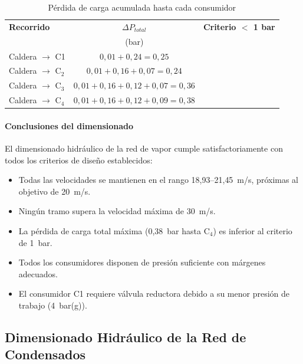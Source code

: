 \documentclass[12pt]{article}
\begin{document}
\begin{table}[H]
	\centering
	\caption{Pérdida de carga acumulada hasta cada consumidor}
	\label{tab:perdidas-acumuladas}
	\begin{tabular}{lcc}
		\toprule
		\textbf{Recorrido}          & \textbf{$\Delta P_{total}$}                  & \textbf{Criterio $<$ 1 bar} \\
		                            & (bar)                                        &                             \\
		\midrule
		Caldera $\rightarrow$ C1 & $0{,}01 + 0{,}24 = 0{,}25$                   & \checkmark                  \\
		Caldera $\rightarrow$ C$_2$ & $0{,}01 + 0{,}16 + 0{,}07 = 0{,}24$          & \checkmark                  \\
		Caldera $\rightarrow$ C$_3$ & $0{,}01 + 0{,}16 + 0{,}12 + 0{,}07 = 0{,}36$ & \checkmark                  \\
		Caldera $\rightarrow$ C$_4$ & $0{,}01 + 0{,}16 + 0{,}12 + 0{,}09 = 0{,}38$ & \checkmark                  \\
		\bottomrule
	\end{tabular}
\end{table}

\paragraph{Conclusiones del dimensionado}

El dimensionado hidráulico de la red de vapor cumple satisfactoriamente con todos los criterios de diseño establecidos:

\begin{itemize}[noitemsep]
	\item Todas las velocidades se mantienen en el rango 18{,}93--21{,}45~m/s, próximas al objetivo de 20~m/s.
	\item Ningún tramo supera la velocidad máxima de 30~m/s.
	\item La pérdida de carga total máxima (0{,}38~bar hasta C$_4$) es inferior al criterio de 1~bar.
	\item Todos los consumidores disponen de presión suficiente con márgenes adecuados.
	\item El consumidor C1 requiere válvula reductora debido a su menor presión de trabajo (4~bar(g)).
\end{itemize}

\subsection{Dimensionado Hidráulico de la Red de Condensados}
\label{subsec:dimensionado-condensados}
\end{document}
